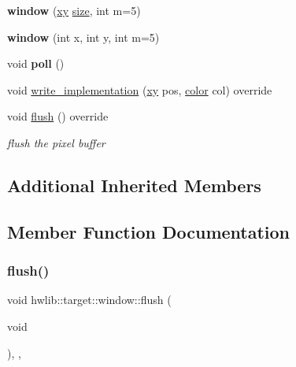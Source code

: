 \begin{DoxyCompactItemize}
\mbox{\label{classhwlib_1_1target_1_1window_a266159cf8c02b85747d0f43eb519b0e0}} 
{\bfseries window} (\hyperlink{classhwlib_1_1xy}{xy} \hyperlink{classhwlib_1_1window_ad2ad5281c9c09d18010b19cb807d3eaa}{size}, int m=5)
\item 
\mbox{\label{classhwlib_1_1target_1_1window_a73bf147c1b4348fae0f78395ab1b164a}} 
{\bfseries window} (int x, int y, int m=5)
\item 
\mbox{\label{classhwlib_1_1target_1_1window_aa0d41fa8c4b4fa8671b1f4d9d6f4988d}} 
void {\bfseries poll} ()
\item 
void \hyperlink{classhwlib_1_1target_1_1window_ae432e3dc481e789f5d972331eb1f6725}{write\+\_\+implementation} (\hyperlink{classhwlib_1_1xy}{xy} pos, \hyperlink{classhwlib_1_1color}{color} col) override
\item 
void \hyperlink{classhwlib_1_1target_1_1window_a00ef1d2bba8684306ee8051fbf469900}{flush} () override
\begin{DoxyCompactList}\small\item\em flush the pixel buffer \end{DoxyCompactList}\end{DoxyCompactItemize}
\subsection*{Additional Inherited Members}


\subsection{Member Function Documentation}
\mbox{\label{classhwlib_1_1target_1_1window_a00ef1d2bba8684306ee8051fbf469900}} 
\subsubsection{\texorpdfstring{flush()}{flush()}\hspace{0.1cm}{\footnotesize\ttfamily [1/2]}}
{\footnotesize\ttfamily void hwlib\+::target\+::window\+::flush (\begin{DoxyParamCaption}\item[{void}]{ }\end{DoxyParamCaption})\hspace{0.3cm}{\ttfamily [inline]}, {\ttfamily [override]}, {\ttfamily [virtual]}}




